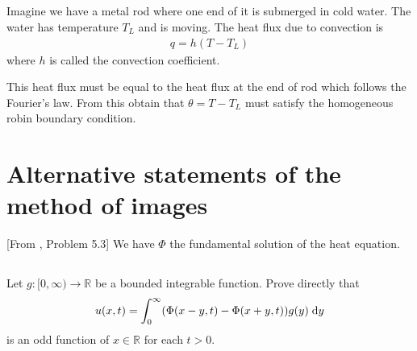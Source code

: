 \documentclass[11pt,letterpaper]{report}
\begin{document}
\subsection{}
Imagine we have a metal rod where one end of it is submerged in cold water. The water has temperature $T_L$ and is moving. The heat flux due to convection is
\begin{align}
    q = h(T-T_L)
\end{align}
where $h$ is called the convection coefficient.

This heat flux must be equal to the heat flux at the end of rod which follows the Fourier's law. From this obtain that $\theta = T-T_L$ must satisfy the homogeneous robin boundary condition.




\section{Alternative statements of the method of images}
[From \cite{ShearerLevy_15}, Problem 5.3] We have $\Phi$ the fundamental solution of the heat equation.

\subsection{}
Let $g:[0,\infty)\to\mathbb{R}$ be a bounded integrable function. Prove directly that
\begin{align}
    u(x,t)=\int_0^\infty (\Phi(x-y,t)-\Phi(x+y,t))g(y)\;\mathrm{d} y
\end{align}
is an odd function of $x\in\mathbb{R}$ for each $t>0$.
\end{document}
